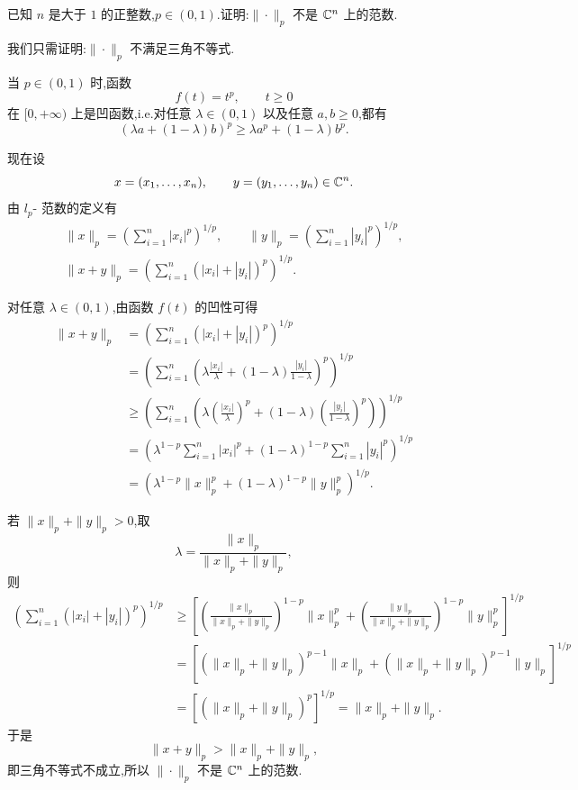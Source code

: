 \begin{problem}
已知 $n$ 是大于 $1$ 的正整数,$p\in(0,1)$.证明:$\|\cdot\|_p$ 不是 $\mathbb{C}^n$ 上的范数.
\begin{solution}
    我们只需证明:$\|\cdot\|_p$ 不满足三角不等式.

    当 $p\in(0,1)$ 时,函数
    \[
        f(t)=t^p,\qquad t\ge 0
    \]
    在 $[0,+\infty)$ 上是凹函数,i.e.对任意 $\lambda\in(0,1)$ 以及任意 $a,b\ge 0$,都有
    \[
        (\lambda a+(1-\lambda)b)^p\ge \lambda a^p+(1-\lambda)b^p.
    \]

    现在设
    \[
        x=(x_1,\dots,x_n),\qquad y=(y_1,\dots,y_n)\in\mathbb{C}^n.
    \]
    由 $l_p$- 范数的定义有
    \begin{gather*}
        \|x\|_p=\left(\sum_{i=1}^{n}|x_i|^p\right)^{1/p},\qquad
        \|y\|_p=\left(\sum_{i=1}^{n}|y_i|^p\right)^{1/p}, \\
        \|x+y\|_p=\left(\sum_{i=1}^{n}(|x_i|+|y_i|)^p\right)^{1/p}.
    \end{gather*}

    对任意 $\lambda\in(0,1)$,由函数 $f(t)$ 的凹性可得
    \begin{align*}
        \|x+y\|_p &= \left(\sum_{i=1}^{n}(|x_i|+|y_i|)^p\right)^{1/p} \\
        &=\left(\sum_{i=1}^{n}\left(\lambda\frac{|x_i|}{\lambda}+(1-\lambda)\frac{|y_i|}{1-\lambda}\right)^p\right)^{1/p} \\
        &\ge \left(\sum_{i=1}^{n}\left(\lambda\left(\frac{|x_i|}{\lambda}\right)^p+(1-\lambda)\left(\frac{|y_i|}{1-\lambda}\right)^p\right)\right)^{1/p} \\
        &=\left(\lambda^{1-p}\sum_{i=1}^{n}|x_i|^p+(1-\lambda)^{1-p}\sum_{i=1}^{n}|y_i|^p\right)^{1/p} \\
        &=\left(\lambda^{1-p}\|x\|_p^p+(1-\lambda)^{1-p}\|y\|_p^p\right)^{1/p}.
    \end{align*}

    若 $\|x\|_p+\|y\|_p>0$,取
    \[
        \lambda=\frac{\|x\|_p}{\|x\|_p+\|y\|_p},
    \]
    则
    \begin{align*}
        \left(\sum_{i=1}^{n}(|x_i|+|y_i|)^p\right)^{1/p}
        &\ge \left[\left(\frac{\|x\|_p}{\|x\|_p+\|y\|_p}\right)^{1-p}\|x\|_p^p
        +\left(\frac{\|y\|_p}{\|x\|_p+\|y\|_p}\right)^{1-p}\|y\|_p^p\right]^{1/p} \\
        &=\left[(\|x\|_p+\|y\|_p)^{p-1}\|x\|_p+(\|x\|_p+\|y\|_p)^{p-1}\|y\|_p\right]^{1/p} \\
        &=\left[(\|x\|_p+\|y\|_p)^p\right]^{1/p}
        =\|x\|_p+\|y\|_p.
    \end{align*}
    于是
    \[
        \|x+y\|_p>\|x\|_p+\|y\|_p,
    \]
    即三角不等式不成立,所以 $\|\cdot\|_p$ 不是 $\mathbb{C}^n$ 上的范数.
\end{solution}
\end{problem}

